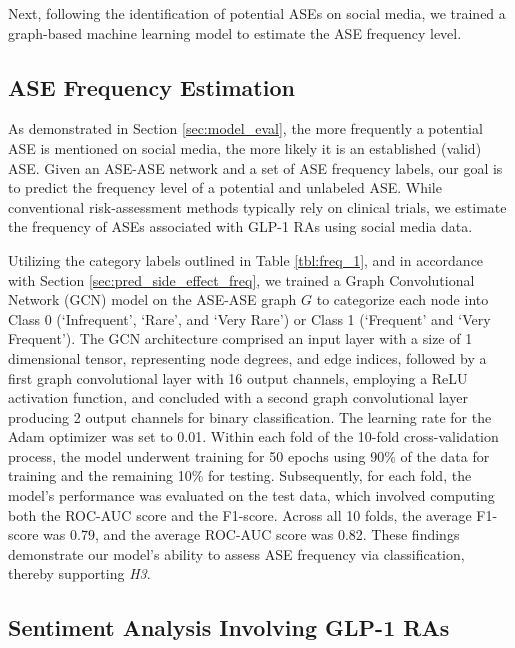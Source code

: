 \documentclass[referee,bst/sn-basic]{sn-jnl}%
\begin{document}
Next, following the identification of potential ASEs on social media, we trained a graph-based machine learning model to estimate the ASE frequency level.

\subsection{ASE Frequency Estimation}
\label{subsec:GCN}

As demonstrated in Section \ref{sec:model_eval}, the more frequently a potential ASE is mentioned on social media, the more likely it is an established (valid) ASE. 
Given an ASE-ASE network and a set of ASE frequency labels, our goal is to predict the frequency level of a potential and unlabeled ASE. 
While conventional risk-assessment methods typically rely on clinical trials, we estimate the frequency of ASEs associated with GLP-1 RAs using social media data.

Utilizing the category labels outlined in Table \ref{tbl:freq_1}, and in accordance with Section \ref{sec:pred_side_effect_freq}, we trained a Graph Convolutional Network (GCN) model on the ASE-ASE graph $G$ to categorize each node into Class 0 (`Infrequent', `Rare', and `Very Rare') or Class 1 (`Frequent' and `Very Frequent').
The GCN architecture comprised an input layer with a size of 1 dimensional tensor, representing node degrees, and edge indices, followed by a first graph convolutional layer with 16 output channels, employing a ReLU activation function, and concluded with a second graph convolutional layer producing 2 output channels for binary classification. 
The learning rate for the Adam optimizer was set to 0.01. 
Within each fold of the 10-fold cross-validation process, the model underwent training for 50 epochs using 90\% of the data for training and the remaining 10\% for testing. 
Subsequently, for each fold, the model's performance was evaluated on the test data, which involved computing both the ROC-AUC score and the F1-score.
Across all 10 folds, the average F1-score was 0.79, and the average ROC-AUC score was 0.82. 
These findings demonstrate our model's ability to assess ASE frequency via classification, thereby supporting \textit{H3}.

\subsection{Sentiment Analysis Involving GLP-1 RAs}
\label{subsec:sentiment}
\begin{comment}
{
    'Trulicity':'Dulaglutide',
    'Byetta':'Exenatide',
    'Bydureon':'Exenatide',
    'Victoza':'Liraglutide',
     Adlyxin':'Lixisenatide',
    'Ozempic':'Semaglutide',
    'Rybelsus: 'Semaglutide''
}
\end{comment}
\end{document}
